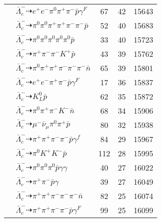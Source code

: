 \documentclass[landscape]{article}
\newcounter{rownumbers}
\newcommand\rn{\stepcounter{rownumbers}\arabic{rownumbers}}
\newcommand{\EOL}{\\} %
\newcommand{\topoTags}[1]{#1} %
\begin{document}
\begin{longtable}{clccc}
\rn & $ \bar{\Lambda}_{c}^{-} \dashrightarrow e^{+} e^{-} \pi^{0} \pi^{+} \pi^{-} \bar{p} \gamma^{F} $ & \topoTags{67 & }42 & 15643 \EOL

\rn & $ \bar{\Lambda}_{c}^{-} \dashrightarrow \pi^{0} \pi^{0} \pi^{+} \pi^{+} \pi^{-} \pi^{-} \bar{p} $ & \topoTags{52 & }40 & 15683 \EOL

\rn & $ \bar{\Lambda}_{c}^{-} \dashrightarrow \pi^{0} \pi^{0} \pi^{0} \pi^{0} \pi^{0} \bar{p} $ & \topoTags{33 & }40 & 15723 \EOL

\rn & $ \bar{\Lambda}_{c}^{-} \dashrightarrow \pi^{+} \pi^{-} \pi^{-} K^{+} \bar{p} $ & \topoTags{43 & }39 & 15762 \EOL

\rn & $ \bar{\Lambda}_{c}^{-} \dashrightarrow \pi^{0} \pi^{+} \pi^{+} \pi^{-} \pi^{-} \pi^{-} \bar{n} $ & \topoTags{65 & }39 & 15801 \EOL

\rn & $ \bar{\Lambda}_{c}^{-} \dashrightarrow e^{+} e^{-} \pi^{+} \pi^{-} \bar{p} \gamma^{F} $ & \topoTags{17 & }36 & 15837 \EOL

\rn & $ \bar{\Lambda}_{c}^{-} \dashrightarrow K_{L}^{0} \bar{p} $ & \topoTags{62 & }35 & 15872 \EOL

\rn & $ \bar{\Lambda}_{c}^{-} \dashrightarrow \pi^{0} \pi^{+} \pi^{-} K^{-} \bar{n} $ & \topoTags{68 & }34 & 15906 \EOL

\rn & $ \bar{\Lambda}_{c}^{-} \dashrightarrow \mu^{-} \bar{\nu}_{\mu} \pi^{0} \pi^{+} \bar{p} $ & \topoTags{80 & }32 & 15938 \EOL

\rn & $ \bar{\Lambda}_{c}^{-} \dashrightarrow \pi^{+} \pi^{+} \pi^{-} \pi^{-} \bar{p} \gamma^{f} $ & \topoTags{84 & }29 & 15967 \EOL

\rn & $ \bar{\Lambda}_{c}^{-} \dashrightarrow \pi^{0} K^{+} K^{-} \bar{p} $ & \topoTags{112 & }28 & 15995 \EOL

\rn & $ \bar{\Lambda}_{c}^{-} \dashrightarrow \pi^{0} \pi^{0} \pi^{0} \bar{p} \gamma \gamma $ & \topoTags{40 & }27 & 16022 \EOL

\rn & $ \bar{\Lambda}_{c}^{-} \dashrightarrow \pi^{+} \pi^{-} \bar{p} \gamma $ & \topoTags{39 & }27 & 16049 \EOL

\rn & $ \bar{\Lambda}_{c}^{-} \dashrightarrow \pi^{+} \pi^{+} \pi^{-} \pi^{-} \pi^{-} \bar{n} $ & \topoTags{82 & }25 & 16074 \EOL

\rn & $ \bar{\Lambda}_{c}^{-} \dashrightarrow \pi^{+} \pi^{+} \pi^{-} \pi^{-} \bar{p} \gamma^{F} $ & \topoTags{99 & }25 & 16099 \EOL


\end{longtable}
\end{document}
